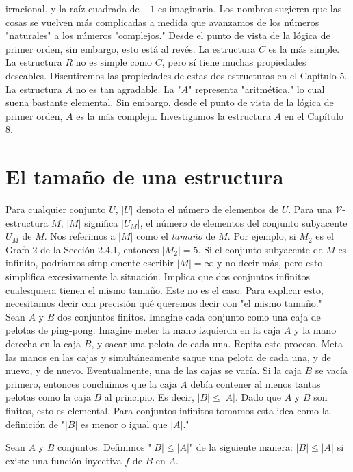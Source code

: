\documentclass[12pt,a4paper]{book}
\newcommand{\comillas}[1]{"#1"}
\newcommand{\VV}{\mathcal{V}}
\begin{document}
    irracional, y la raíz cuadrada de $-1$ es imaginaria. Los nombres sugieren que las cosas se vuelven más complicadas a
    medida que avanzamos de los números \comillas{naturales} a los números \comillas{complejos.} Desde el punto de vista de
    la lógica de primer orden, sin embargo, esto está al revés. La estructura $C$ es la más simple. La estructura $R$ no es
    simple como $C$, pero sí tiene muchas propiedades deseables. Discutiremos las propiedades de estas dos estructuras en
    el Capítulo 5. La estructura $A$ no es tan agradable. La \comillas{$A$} representa \comillas{aritmética,} lo cual suena
    bastante elemental. Sin embargo, desde el punto de vista de la lógica de primer orden, $A$ es la más compleja.
    Investigamos la estructura $A$ en el Capítulo 8.

    \section{El tamaño de una estructura}

    Para cualquier conjunto $U$, $|U|$ denota el número de elementos de $U$. Para una $\VV$-estructura $M$, $|M|$ significa
    $|U_{M}|$, el número de elementos del conjunto subyacente $U_{M}$ de $M$. Nos referimos a $|M|$ como el
    \textit{tamaño} de $M$. Por ejemplo, si $M_{2}$ es el Grafo 2 de la Sección 2.4.1, entonces $|M_{2}|=5$. Si el conjunto
    subyacente de $M$ es infinito, podríamos simplemente escribir $|M|=\infty$ y no decir más, pero esto simplifica
    excesivamente la situación. Implica que dos conjuntos infinitos cualesquiera tienen el mismo tamaño. Este no es el
    caso. Para explicar esto, necesitamos decir con precisión qué queremos decir con \comillas{el mismo tamaño.}\\
    Sean $A$ y $B$ dos conjuntos finitos. Imagine cada conjunto como una caja de pelotas de ping-pong. Imagine meter la
    mano izquierda en la caja $A$ y la mano derecha en la caja $B$, y sacar una pelota de cada una. Repita este proceso.
    Meta las manos en las cajas y simultáneamente saque una pelota de cada una, y de nuevo, y de nuevo. Eventualmente, una
    de las cajas se vacía. Si la caja $B$ se vacía primero, entonces concluimos que la caja $A$ debía contener al menos
    tantas pelotas como la caja $B$ al principio. Es decir, $|B|\leq|A|$. Dado que $A$ y $B$ son finitos, esto es
    elemental. Para conjuntos infinitos tomamos esta idea como la definición de \comillas{$|B|$ es menor o igual que $|A|$.}

    \begin{definicion}\label{def:menor-igual-tamano}
        Sean $A$ y $B$ conjuntos. Definimos \comillas{$|B|\leq|A|$} de la siguiente manera: $|B|\leq|A|$ si existe una
        función inyectiva $f$ de $B$ en $A$.
    \end{definicion}
\end{document}
